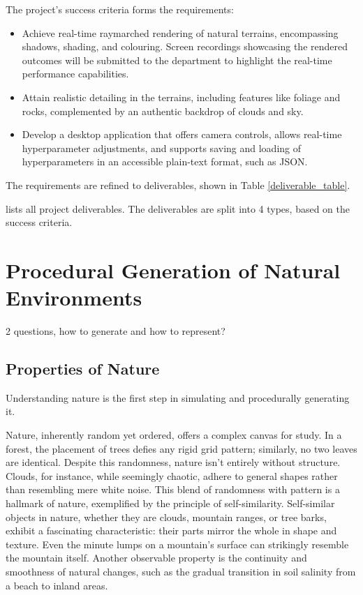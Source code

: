 The project’s success criteria forms the requirements:

\begin{itemize}
    \item Achieve real-time raymarched rendering of natural terrains, encompassing shadows, shading, and colouring. Screen recordings showcasing the rendered outcomes will be submitted to the department to highlight the real-time performance capabilities.
    \item Attain realistic detailing in the terrains, including features like foliage and rocks, complemented by an authentic backdrop of clouds and sky.
    \item Develop a desktop application that offers camera controls, allows real-time hyperparameter adjustments, and supports saving and loading of hyperparameters in an accessible plain-text format, such as JSON.
\end{itemize}

The requirements are refined to deliverables, shown in Table \ref{deliverable_table}.

{lists all project deliverables. The deliverables are split into 4 types, based on the success criteria.}

\section{Procedural Generation of Natural Environments}
\label{Procedural Generation}

2 questions, how to generate and how to represent?

\subsection{Properties of Nature}

Understanding nature is the first step in simulating and procedurally generating it.

Nature, inherently random yet ordered, offers a complex canvas for study. In a forest, the placement of trees defies any rigid grid pattern; similarly, no two leaves are identical. Despite this randomness, nature isn't entirely without structure. Clouds, for instance, while seemingly chaotic, adhere to general shapes rather than resembling mere white noise. This blend of randomness with pattern is a hallmark of nature, exemplified by the principle of self-similarity. Self-similar objects in nature, whether they are clouds, mountain ranges, or tree barks, exhibit a fascinating characteristic: their parts mirror the whole in shape and texture. Even the minute lumps on a mountain's surface can strikingly resemble the mountain itself. Another observable property is the continuity and smoothness of natural changes, such as the gradual transition in soil salinity from a beach to inland areas.

